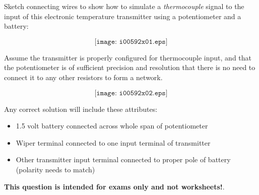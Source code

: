 

Sketch connecting wires to show how to simulate a {\it thermocouple} signal to the input of this electronic temperature transmitter using a potentiometer and a battery:

$$\texttt{[image: i00592x01.eps]}$$

Assume the transmitter is properly configured for thermocouple input, and that the potentiometer is of sufficient precision and resolution that there is no need to connect it to any other resistors to form a network.







$$\texttt{[image: i00592x02.eps]}$$

Any correct solution will include these attributes:

\begin{itemize}
\item{} 1.5 volt battery connected across whole span of potentiometer
\item{} Wiper terminal connected to one input terminal of transmitter
\item{} Other transmitter input terminal connected to proper pole of battery (polarity needs to match)
\end{itemize}







{\bf This question is intended for exams only and not worksheets!}.



